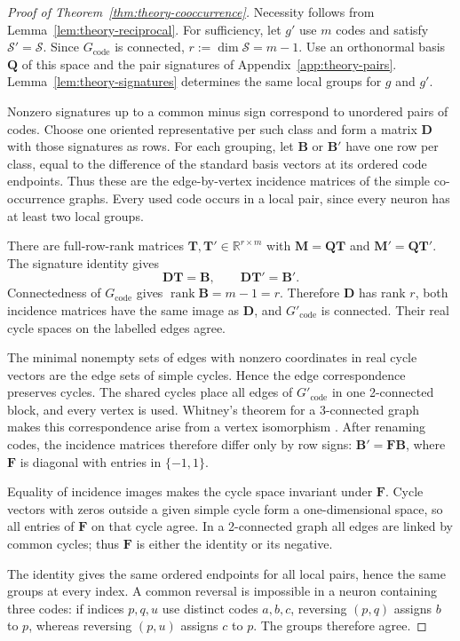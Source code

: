 \begin{proof}[Proof of Theorem~\ref{thm:theory-cooccurrence}]
    Necessity follows from Lemma~\ref{lem:theory-reciprocal}.
    For sufficiency, let $g'$ use $m$ codes and satisfy
    $\mathcal S'=\mathcal S$.
    Since $G_{\mathrm{code}}$ is connected,
    $r:=\dim\mathcal S=m-1$.
    Use an orthonormal basis $\mathbf Q$ of this space and the pair
    signatures of Appendix~\ref{app:theory-pairs}.
    Lemma~\ref{lem:theory-signatures} determines the same local
    groups for $g$ and $g'$.

    Nonzero signatures up to a common minus sign correspond to
    unordered pairs of codes. Choose one oriented representative
    per such class and form a matrix $\mathbf D$ with those
    signatures as rows.
    For each grouping, let $\mathbf B$ or
    $\mathbf B'$ have one row per class, equal to the
    difference of the standard basis vectors at its ordered code
    endpoints. Thus these are the edge-by-vertex incidence
    matrices of the simple co-occurrence graphs.
    Every used code occurs in a local pair, since every neuron
    has at least two local groups.

    There are full-row-rank matrices
    $\mathbf T,\mathbf T'\in\mathbb R^{r\times m}$
    with $\mathbf M=\mathbf Q\mathbf T$ and
    $\mathbf M'=\mathbf Q\mathbf T'$.
    The signature identity gives
    $$
        \mathbf D\mathbf T=\mathbf B,
        \qquad
        \mathbf D\mathbf T'=\mathbf B'.
    $$
    Connectedness of $G_{\mathrm{code}}$ gives
    $\operatorname{rank}\mathbf B=m-1=r$.
    Therefore $\mathbf D$ has rank $r$, both incidence matrices
    have the same image as $\mathbf D$, and $G'_{\mathrm{code}}$ is
    connected. Their real cycle spaces on the labelled edges agree.

    The minimal nonempty sets of edges with nonzero coordinates in
    real cycle vectors are the edge sets of simple cycles. Hence the
    edge correspondence preserves cycles.
    The shared cycles place all edges of $G'_{\mathrm{code}}$ in one
    2-connected block, and every vertex is used.
    Whitney's theorem for a 3-connected graph makes this
    correspondence arise from a vertex isomorphism
    \cite{fomin2020whitney}. After renaming codes, the incidence
    matrices therefore differ only by row signs:
    $\mathbf B'=\mathbf F\mathbf B$,
    where $\mathbf F$ is diagonal with entries in $\{-1,1\}$.

    Equality of incidence images makes the cycle space invariant
    under $\mathbf F$. Cycle vectors with zeros outside a given simple
    cycle form a one-dimensional space, so all entries of $\mathbf F$
    on that cycle agree.
    In a 2-connected graph all edges are linked by common cycles;
    thus $\mathbf F$ is either the identity or its negative.

    The identity gives the same ordered endpoints for all local
    pairs, hence the same groups at every index.
    A common reversal is impossible in a neuron containing three
    codes: if indices $p,q,u$ use distinct codes $a,b,c$, reversing
    $(p,q)$ assigns $b$ to $p$, whereas reversing $(p,u)$ assigns
    $c$ to $p$. The groups therefore agree.
\end{proof}

